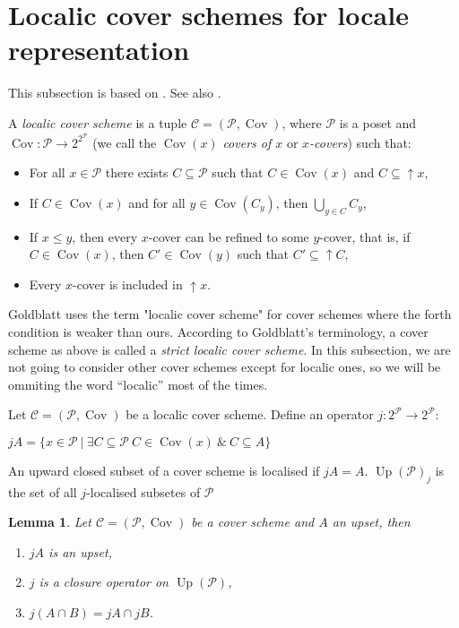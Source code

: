 \documentclass[a4paper]{article}
\theoremstyle{defin}
\theoremstyle{theorem}
\theoremstyle{claim}
\theoremstyle{prop}
\theoremstyle{lemma}
\newtheorem{lemma}{Lemma}
\theoremstyle{fact}
\theoremstyle{ex}
\theoremstyle{col}
\begin{document}
\section{Localic cover schemes for locale representation}

This subsection is based on \cite{goldblatt2011cover}. See also \cite{Bell2003CoverSF}.

A \emph{localic cover scheme} is a tuple $\mathcal{C} = (\mathcal{P}, \operatorname{Cov})$, where $\mathcal{P}$ is a poset and $\operatorname{Cov} : \mathcal{P} \to 2^{2^{\mathcal{P}}}$ (we call the $\operatorname{Cov}(x)$ \emph{covers of $x$} or \emph{$x$-covers}) such that:
\begin{itemize}
\item For all $x \in \mathcal{P}$ there exists $C \subseteq \mathcal{P}$ such that $C \in \operatorname{Cov}(x)$ and $C \subseteq \uparrow x$,
\item If $C \in \operatorname{Cov}(x)$ and for all $y \in \operatorname{Cov}(C_y)$, then $\bigcup \limits_{y \in C} C_y$,
\item If $x \leq y$, then every $x$-cover can be refined to some $y$-cover, that is, if $C \in \operatorname{Cov}(x)$, then $C' \in \operatorname{Cov}(y)$ such that $C' \subseteq \uparrow C$,
\item Every $x$-cover is included in $\uparrow x$.
\end{itemize}

Goldblatt uses the term "localic cover scheme" for cover schemes where the forth condition is weaker than ours. According to Goldblatt's terminology, a cover scheme as above is called a \emph{strict localic cover scheme}. In this subsection, we are not going to consider other cover schemes except for localic ones, so we will be ommiting the word ``localic'' most of the times.

Let $\mathcal{C} = (\mathcal{P}, \operatorname{Cov})$ be a localic cover scheme. Define an operator $j : 2^\mathcal{P}
\to 2^\mathcal{P}$:
\begin{center}
$j A = \{ x \in \mathcal{P} \: | \: \exists C \subseteq \mathcal{P} \: C \in \operatorname{Cov}(x) \: \& \: C \subseteq A\}$
\end{center}

An upward closed subset of a cover scheme is localised if $j A = A$. $\operatorname{Up}(\mathcal{P})_j$ is the set of all $j$-localised subsetes of $\mathcal{P}$

\begin{lemma} Let $\mathcal{C} = (\mathcal{P}, \operatorname{Cov})$ be a cover scheme and $A$ an upset, then

\begin{enumerate}
\item $j A$ is an upset,
\item $j$ is a closure operator on $\operatorname{Up}(\mathcal{P})$,
\item $j (A \cap B) = j A \cap j B$.
\end{enumerate}

\end{lemma}
\end{document}
